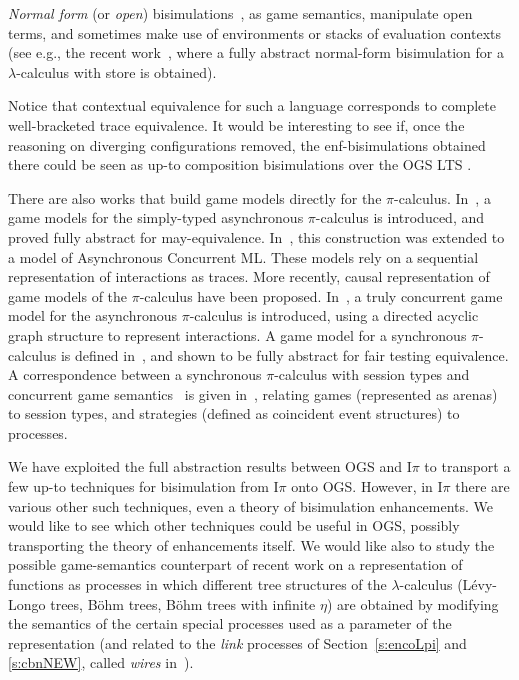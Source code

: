 \documentclass[11pt,a4paper]{amsart}
\theoremstyle{plain}
\theoremstyle{definition}
\theoremstyle{defC}
\theoremstyle{thmC}
\theoremstyle{plain}
\numberwithin{equation}{section}
\newcommand{\Intp}{\mbox{I$\pi$}\xspace}   %
\newcommand{\piI}{\Intp}   %
\theoremstyle{plain}
\theoremstyle{definition}
\newcommand{\cutLMCSsecondRound}[1]{}
\begin{document}
\emph{Normal form} (or \emph{open}) bisimulations~\cite{lassentrees,Stovring-Lassen},
as game
semantics, 
manipulate open terms, and sometimes make use of
environments or stacks of evaluation contexts (see e.g., the recent
work~\cite{biernacki2019complete}, where  a fully abstract  normal-form 
bisimulation for a $\lambda$-calculus with store is obtained).  

Notice that contextual equivalence for such a language corresponds to complete well-bracketed 
trace equivalence.
It would be interesting to see if, once the reasoning on diverging configurations removed,
the enf-bisimulations obtained there could be seen as up-to composition bisimulations
over the OGS LTS \cutLMCSsecondRound{for the $\lambda\rho$-calculus presented in Appendix~\ref{a:LambdaRho},
that is fully abstract for this language}.

There are also works that build
game models directly for the $\pi$-calculus.
In~\cite{laird2005game}, a game models for the simply-typed asynchronous $\pi$-calculus 
is introduced, and proved fully abstract for may-equivalence.
In~\cite{10.1007/11944836_38}, this construction was extended to a model of Asynchronous Concurrent ML.
These models rely on a sequential representation of interactions as traces.
More recently, causal representation of game models of the $\pi$-calculus have been proposed.
In~\cite{sakayori2017truly}, a truly concurrent game model for the asynchronous $\pi$-calculus is introduced,
using a directed acyclic graph structure to represent interactions.
%
A game model for a synchronous $\pi$-calculus is defined in~\cite{eberhart2015intensionally}, and shown to
be fully abstract for fair testing equivalence. 
A correspondence between a synchronous $\pi$-calculus with session types and 
concurrent game semantics~\cite{winskel2017games}
is given in~\cite{10.1145/3290340}, relating 
games (represented as arenas) to  session types, and 
strategies (defined as coincident event structures) to processes.


We have exploited the full abstraction results between OGS and \piI
 to transport a few  up-to techniques for
  bisimulation  from
  \piI onto OGS.  However, in \piI there are various other such techniques, even a theory of
 bisimulation enhancements.  We would like to see which other techniques could be useful
 in OGS,  possibly transporting  the theory of enhancements itself. 
We would like also to study the possible game-semantics counterpart of recent work on a
 representation of functions as processes \cite{SakayoriS23} in which different tree structures of the
$\lambda$-calculus (Lévy-Longo  trees,  Böhm trees,  Böhm trees with infinite $\eta$) are obtained
by modifying the semantics of the certain special processes used as a parameter of the
representation
 (and related to the \emph{link} processes of
Section~\ref{s:encoLpi} and \ref{s:cbnNEW}, called \emph{wires} in~\cite{SakayoriS23}). 
\end{document}
